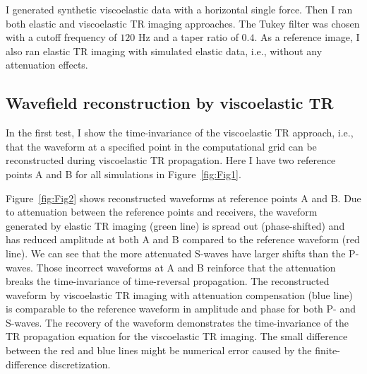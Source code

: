 

I generated synthetic viscoelastic data with a horizontal single force. Then I ran both elastic and viscoelastic TR imaging approaches. The Tukey filter was chosen with a cutoff frequency of $120$ Hz and a taper ratio of $0.4$. As a reference image, I also ran elastic TR imaging with simulated elastic data, i.e., without any attenuation effects. 

\subsection{Wavefield reconstruction by viscoelastic TR} 
In the first test, I show the time-invariance of the viscoelastic TR approach, i.e., that the waveform at a specified point in the computational grid can be reconstructed during viscoelastic TR propagation. Here I have two reference points A and B for all simulations in Figure~\ref{fig:Fig1}. 

Figure~\ref{fig:Fig2} shows reconstructed waveforms at reference points A and B. Due to attenuation between the reference points and receivers, the waveform generated by elastic TR imaging (green line) is spread out (phase-shifted) and has reduced amplitude at both A and B compared to the reference waveform (red line). We can see that the more attenuated S-waves have larger shifts than the P-waves. Those incorrect waveforms at A and B reinforce that the attenuation breaks the time-invariance of time-reversal propagation. The reconstructed waveform by viscoelastic TR imaging with attenuation compensation (blue line) is comparable to the reference waveform in amplitude and phase for both P- and S-waves. The recovery of the waveform demonstrates the time-invariance of the TR propagation equation for the viscoelastic TR imaging. The small difference between the red and blue lines might be numerical error caused by the finite-difference discretization. 


